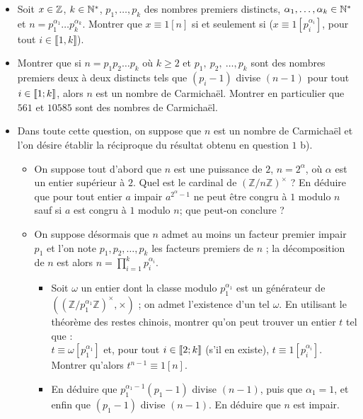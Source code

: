 \documentclass[11pt,a4paper]{article}
\begin{document}
\begin{itemize}
\item[$1.a)$] Soit $x\in  \mathbb{Z}$, $k\in \mathbb{N}^*$, $p_1,\ldots,p_k$ des nombres premiers distincts, $\alpha_1,\ldots,\alpha_k\in \mathbb{N}^*$ et $n=p_1^{\alpha_1}\ldots p_k^{\alpha_k}$. Montrer que $x\equiv 1[n]$ si et seulement si ($x\equiv 1[p_i^{\alpha_i}]$, pour tout $i\in \llbracket 1,k\rrbracket$).

\item[$1.b)$] Montrer que si $n = p_1  p_2 \ldots  p_k$ où $k\geq 2$ et $p_1,\ p_2,\ \ldots, p_k$ sont des nombres premiers deux à deux
distincts tels que $(p_i - 1)$ divise $(n - 1)$ pour tout $i\in \llbracket 1; k\rrbracket$, alors $n$ est un nombre de Carmichaël.
Montrer en particulier que $561$ et $10585$ sont des nombres de Carmichaël.\\
\item[$2.$] Dans toute cette question, on suppose que $n$ est un nombre de Carmichaël et l'on désire établir la réciproque du résultat obtenu en question $1$ b).\\
\begin{itemize}
\item[$a)$] On suppose tout d'abord que $n$ est une puissance de $2$, $n = 2^{\alpha}$, où $\alpha$ est un entier supérieur à $2$. Quel est le cardinal de $(\mathbb{Z}/n\mathbb{Z})^{\times}$ ? En déduire que pour tout entier $a$ impair $a^{2^{\alpha} - 1}$ ne peut
être congru à $1$ modulo $n$ sauf si $a$ est congru à $1$ modulo $n$; que peut-on conclure ?\\
\item[$b)$] On suppose désormais que $n$ admet au moins un facteur premier impair $p_1$ et l'on note $p_1, p_2,\ldots, p_k$ les facteurs premiers de $n$ ; la décomposition de $n$ est alors $n =\prod_{i=1}^k p_i^{\alpha_i}$.\\
\begin{itemize}
\item[$(i)$] Soit $\omega$ un entier dont la classe modulo $p_1^{\alpha_1}$ est un générateur de $((\mathbb{Z}/p_1^{\alpha_1}
\mathbb{Z})^{\times}, \times)$ ; on admet l'existence d'un tel $\omega$. En utilisant le théorème des restes chinois, montrer qu'on peut trouver un entier $t$ tel que :\\
$t \equiv \omega [p_1^{\alpha_1}]$ et, pour tout $i \in \llbracket 2;k\rrbracket$ (s'il en existe), $t \equiv 1 [p_i^{\alpha_i}]$.\\
Montrer qu'alors $t^{n-1}\equiv 1 [n]$. \\
\item[$(ii)$] En déduire que $p_1^{\alpha_1-1}(p_1 - 1)$ divise $(n- 1)$, puis que $\alpha_1 = 1$, et enfin que $(p_1 - 1)$ divise $(n - 1)$. En déduire que $n$ est impair.\\

\end{itemize}
\end{itemize}
\end{itemize}
\end{document}
